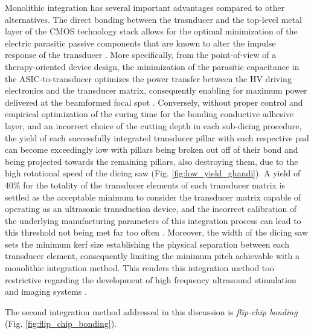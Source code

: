 Monolithic integration has several important advantages compared to other alternatives. The direct bonding between the trasnducer and the top-level metal layer of the CMOS technology stack allows for the optimal minimization of the electric parasitic passive components that are known to alter the impulse response of the transducer \cite{}. More specifically, from the point-of-view of a therapy-oriented device design, the minimization of the parasitic capacitance in the ASIC-to-transducer optimizes the power transfer between the HV driving electronics and the transducer matrix, consequently enabling for maximum power delivered at the beamformed focal spot \cite{TiacoCosta2018, HassanTiago2022}. Conversely, without proper control and empirical optimization of the curing time for the bonding conductive adhesive layer, and an incorrect choice of the cutting depth in each sub-dicing procedure, the yield of each successfully integrated transducer pillar with each respective pad can become exceedingly low with pillars being broken out off of their bond and being projected towards the remaining pillars, also destroying them, due to the high rotational speed of the dicing saw (Fig. \ref{fig:low_yield_ghandi}). A yield of 40\% for the totality of the transducer elements of each transducer matrix is settled as the acceptable minimum to consider the transducer matrix capable of operating as an ultrasonic transduction device, and the incorrect calibration of the underlying manufacturing parameters of this integration process can lead to this threshold not being met far too often \cite{}. Moreover, the width of the dicing saw sets the minimum kerf size establishing the physical separation between each transducer element, consequently limiting the minimum pitch achievable with a monolithic integration method. This renders this integration method too restrictive regarding the development of high frequency ultrasound stimulation and imaging systems \cite{}.
\par 
The second integration method addressed in this discussion is \textit{flip-chip bonding} (Fig. \ref{fig:flip_chip_bonding}). 
